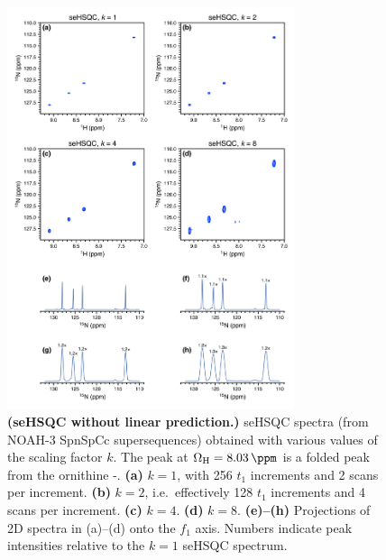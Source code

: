 \begin{figure}
    \centering
    \includegraphics[width=0.75\textwidth]{./figures/spv2_kscale.png}
    \caption{
        \textbf{(seHSQC without linear prediction.)}
        \nitrogen{} seHSQC spectra (from NOAH-3 SpnSpCc supersequences) obtained with various values of the scaling factor $k$.
        The peak at $\Omega_{\ce{H}} = \SI{8.03}{\ppm}$ is a folded peak from the ornithine \textdelta-.
        \textbf{(a)} $k = 1$, with 256 $t_1$ increments and 2 scans per increment.
        \textbf{(b)} $k = 2$, i.e.\ effectively 128 $t_1$ increments and 4 scans per increment.
        \textbf{(c)} $k = 4$.
        \textbf{(d)} $k = 8$.
        \textbf{(e)--(h)} Projections of 2D spectra in (a)--(d) onto the $f_1$ axis.
        Numbers indicate peak intensities relative to the $k = 1$ seHSQC spectrum.
        \grami{}
    }
    \label{fig:spv2_kscale}
\end{figure}


